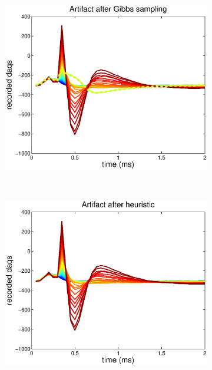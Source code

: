 \documentclass[12pt,letterpaper,fleqn]{article}
\begin{document}
\begin{figure}[ht!]
\begin{subfigure}[b]{0.32\textwidth}
                \includegraphics[width=\textwidth]{A2.eps}
                \caption{}
        \end{subfigure}
       ~ \begin{subfigure}[b]{0.32\textwidth}
                \includegraphics[width=\textwidth]{A3.eps}
                \caption{}
                \end{subfigure}

\end{figure}
\end{document}
